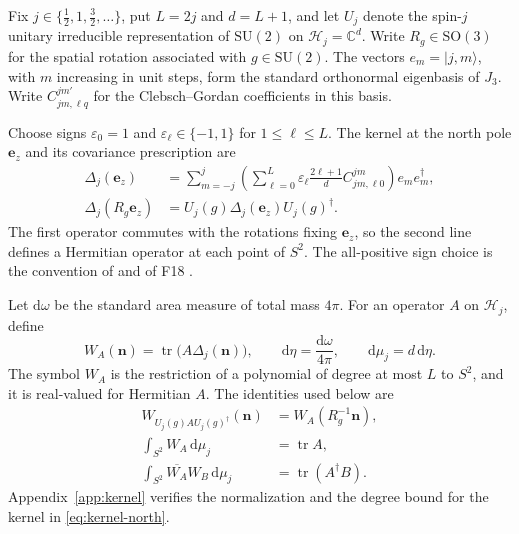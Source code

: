 \documentclass[11pt,a4paper]{article}
\DeclareMathOperator{\tr}{tr}
\newcommand{\SU}{\mathrm{SU}}
\newcommand{\SO}{\mathrm{SO}}
\newcommand{\dd}{\,\mathrm{d}}
\newcommand{\vn}{\mathbf n}
\begin{document}
Fix \(j\in\{\tfrac12,1,\tfrac32,\ldots\}\), put \(L=2j\) and
\(d=L+1\), and let \(U_j\) denote the spin-\(j\) unitary irreducible
representation of \(\SU(2)\) on \(\mathcal H_j=\mathbb C^d\).
Write \(R_g\in\SO(3)\) for the spatial rotation associated with
\(g\in\SU(2)\). The vectors \(e_m=|j,m\rangle\), with \(m\) increasing
in unit steps, form the standard orthonormal eigenbasis of \(J_3\).
Write \(C_{jm,\ell q}^{jm'}\) for the Clebsch--Gordan coefficients in
this basis.

Choose signs \(\varepsilon_0=1\) and
\(\varepsilon_\ell\in\{-1,1\}\) for \(1\leq\ell\leq L\). The kernel
at the north pole \(\mathbf e_z\) and its covariance prescription are
\begin{align}
  \Delta_j(\mathbf e_z)
  &=\sum_{m=-j}^{j}
    \left(\sum_{\ell=0}^{L}\varepsilon_\ell
    \frac{2\ell+1}{d}C_{jm,\ell 0}^{jm}\right)e_m e_m^\dagger,
    \label{eq:kernel-north}\\
  \Delta_j(R_g\mathbf e_z)
  &=U_j(g)\Delta_j(\mathbf e_z)U_j(g)^\dagger.
    \label{eq:kernel-covariance}
\end{align}
The first operator commutes with the rotations fixing \(\mathbf e_z\),
so the second line defines a Hermitian operator at each point of
\(S^2\). The all-positive sign choice is the convention of
\cite[Eqs.~(7)--(11)]{davis2021} and of F18 \cite{f18}.

Let \(\mathrm d\omega\) be the standard area measure of total mass
\(4\pi\). For an operator \(A\) on \(\mathcal H_j\), define
\begin{equation}
  W_A(\vn)=\tr\bigl(A\Delta_j(\vn)\bigr),\qquad
  \mathrm d\eta=\frac{\mathrm d\omega}{4\pi},\qquad
  \mathrm d\mu_j=d\,\mathrm d\eta .
  \label{eq:measure}
\end{equation}
The symbol \(W_A\) is the restriction of a polynomial of degree at
most \(L\) to \(S^2\), and it is real-valued for Hermitian \(A\).
The identities used below are
\begin{subequations}\label{eq:identities}
\begin{align}
  W_{U_j(g)AU_j(g)^\dagger}(\vn)&=W_A(R_g^{-1}\vn),
    \label{eq:symbol-covariance}\\
  \int_{S^2} W_A\dd\mu_j&=\tr A,
    \label{eq:trace-normalization}\\
  \int_{S^2}\overline{W_A}W_B\dd\mu_j&=\tr(A^\dagger B).
    \label{eq:traciality}
\end{align}
\end{subequations}
Appendix~\ref{app:kernel} verifies the normalization and the degree
bound for the kernel in \eqref{eq:kernel-north}.
\end{document}
